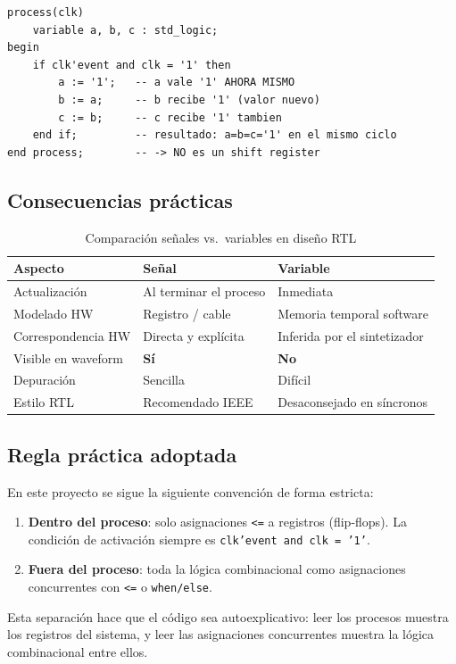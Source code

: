\documentclass[memoria_final]{subfiles}
\begin{document}
\begin{lstlisting}[caption={Mismo código con variables (resultado diferente)}]
process(clk)
    variable a, b, c : std_logic;
begin
    if clk'event and clk = '1' then
        a := '1';   -- a vale '1' AHORA MISMO
        b := a;     -- b recibe '1' (valor nuevo)
        c := b;     -- c recibe '1' tambien
    end if;         -- resultado: a=b=c='1' en el mismo ciclo
end process;        -- -> NO es un shift register
\end{lstlisting}

\subsection{Consecuencias prácticas}

\begin{table}[H]
  \centering
  \caption{Comparación señales vs.\ variables en diseño RTL}
  \begin{tabular}{lll}
    \toprule
    \textbf{Aspecto} & \textbf{Señal} & \textbf{Variable} \\
    \midrule
    Actualización      & Al terminar el proceso    & Inmediata \\
    Modelado HW        & Registro / cable           & Memoria temporal software \\
    Correspondencia HW & Directa y explícita        & Inferida por el sintetizador \\
    Visible en waveform& \textbf{Sí}               & \textbf{No} \\
    Depuración         & Sencilla                  & Difícil \\
    Estilo RTL         & Recomendado IEEE           & Desaconsejado en síncronos \\
    \bottomrule
  \end{tabular}
\end{table}

\subsection{Regla práctica adoptada}

En este proyecto se sigue la siguiente convención de forma estricta:

\begin{enumerate}[leftmargin=1.8cm,itemsep=3pt]
  \item \textbf{Dentro del proceso}: solo asignaciones \texttt{<=} a
    registros (flip-flops). La condición de activación siempre es
    \texttt{clk'event and clk = '1'}.
  \item \textbf{Fuera del proceso}: toda la lógica combinacional como
    asignaciones concurrentes con \texttt{<=} o \texttt{when/else}.
\end{enumerate}

Esta separación hace que el código sea autoexplicativo: leer los procesos
muestra los registros del sistema, y leer las asignaciones concurrentes
muestra la lógica combinacional entre ellos.
\end{document}

